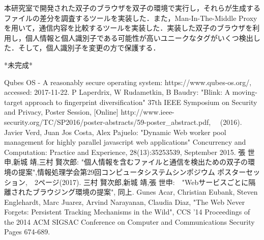 \documentclass[submit]{ipsj}
\begin{document}
本研究室で開発された双子のブラウザを双子の環境で実行し，それらが生成するファイルの差分を調査するツールを実装した．また，Man-In-The-Middle Proxyを用いて，通信内容を比較するツールを実装した．実装した双子のブラウザを利用し，個人情報と個人識別子である可能性が高いユニークなタグがいくつ検出した．そして，個人識別子を変更の方で保護する．

*未完成*



\begin{thebibliography}{1}

 {\small Qubes OS - A reasonably secure operating system: https://www.qubes-os.org/, accessed: 2017-11-22.}
 P Laperdrix, W Rudametkin, B Baudry: "Blink: A moving-target approach to fingerprint diversification" 37th IEEE Symposium on Security and Privacy, Poster Session, [Online]
http://www.ieee-security.org/TC/SP2016/poster-abstracts/59-poster\_abstract.pdf, 　(2016).
Javier Verd, Juan Jos Costa, Alex Pajuelo: "Dynamic Web worker pool management for highly parallel javascript web applications" Concurrency and Computation: Practice and Experience, 28(13):35253539, September 2015.
張 世申,新城 靖,三村 賢次郎: "個人情報を含むファイルと通信を検出ための双子の環境の提案",情報処理学会第29回コンピュータシステムシンポジウム ポスターセッション,　2ページ(2017).
三村 賢次郎,新城 靖,張 世申:　"Webサービスごとに隔離されたブラウジング環境の提案", 同上.
 {Gunes Acar, Christian Eubank, Steven Englehardt, Marc Juarez, Arvind Narayanan, Claudia Diaz, "The Web Never Forgets: Persistent Tracking Mechanisms in the Wild", CCS '14 Proceedings of the 2014 ACM SIGSAC Conference on Computer and Communications Security Pages 674-689. }
\end{thebibliography}
\end{document}
